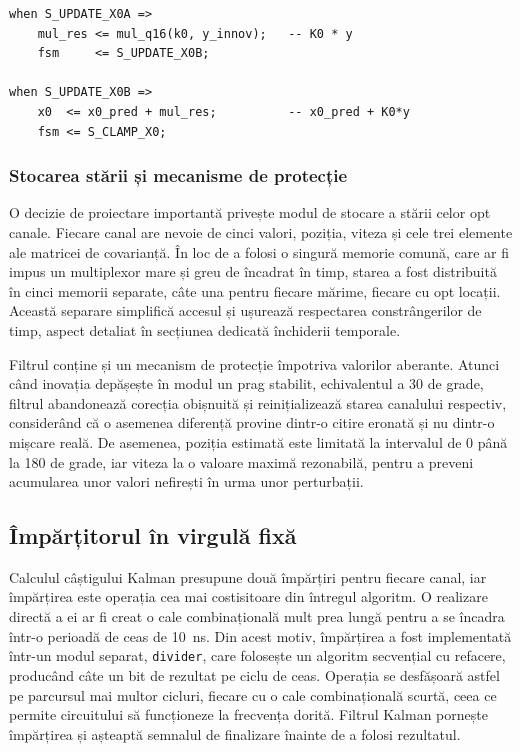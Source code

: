 \begin{lstlisting}[caption={Corecția poziției, separată în înmulțire și adunare.},label={lst:kalman-update}]
when S_UPDATE_X0A =>
    mul_res <= mul_q16(k0, y_innov);   -- K0 * y
    fsm     <= S_UPDATE_X0B;

when S_UPDATE_X0B =>
    x0  <= x0_pred + mul_res;          -- x0_pred + K0*y
    fsm <= S_CLAMP_X0;
\end{lstlisting}

\subsubsection{Stocarea stării și mecanisme de protecție}

O decizie de proiectare importantă privește modul de stocare a stării celor opt
canale. Fiecare canal are nevoie de cinci valori, poziția, viteza și cele trei
elemente ale matricei de covarianță. În loc de a folosi o singură memorie comună,
care ar fi impus un multiplexor mare și greu de încadrat în timp, starea a fost
distribuită în cinci memorii separate, câte una pentru fiecare mărime, fiecare cu
opt locații. Această separare simplifică accesul și ușurează respectarea
constrângerilor de timp, aspect detaliat în secțiunea dedicată închiderii temporale.

Filtrul conține și un mecanism de protecție împotriva valorilor aberante. Atunci când
inovația depășește în modul un prag stabilit, echivalentul a 30 de grade, filtrul
abandonează corecția obișnuită și reinițializează starea canalului respectiv,
considerând că o asemenea diferență provine dintr-o citire eronată și nu dintr-o
mișcare reală. De asemenea, poziția estimată este limitată la intervalul de 0 până la
180 de grade, iar viteza la o valoare maximă rezonabilă, pentru a preveni acumularea
unor valori nefirești în urma unor perturbații.

\subsection{Împărțitorul în virgulă fixă}

Calculul câștigului Kalman presupune două împărțiri pentru fiecare canal, iar
împărțirea este operația cea mai costisitoare din întregul algoritm. O realizare
directă a ei ar fi creat o cale combinațională mult prea lungă pentru a se încadra
într-o perioadă de ceas de 10~ns. Din acest motiv, împărțirea a fost implementată
într-un modul separat, \texttt{divider}, care folosește un algoritm secvențial cu
refacere, producând câte un bit de rezultat pe ciclu de ceas. Operația se desfășoară
astfel pe parcursul mai multor cicluri, fiecare cu o cale combinațională scurtă, ceea
ce permite circuitului să funcționeze la frecvența dorită. Filtrul Kalman pornește
împărțirea și așteaptă semnalul de finalizare înainte de a folosi rezultatul.

